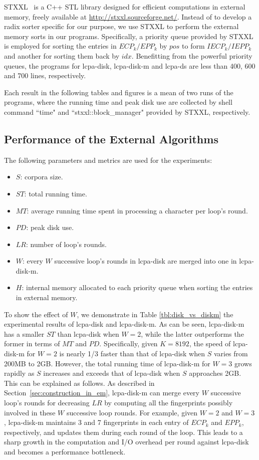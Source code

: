 \documentclass{llncs}
\begin{document}
STXXL~\cite{Dementiev2007} is a {C++} STL library designed for efficient computations in external memory, freely available at \url{http://stxxl.sourceforge.net/}. Instead of to develop a radix sorter specific for our purpose, we use STXXL to perform the external memory sorts in our programs. Specifically, a priority queue  provided by STXXL is employed for sorting the entries in $ECP_k/EPP_k$ by $pos$ to form $IECP_k/IEPP_k$ and another for sorting them back by $idx$. Benefitting from the powerful priority queues, the programs for lcpa-disk, lcpa-disk-m and lcpa-ds are less than 400, 600 and 700 lines, respectively.

Each result in the following tables and figures is a mean of two runs of the programs, where the running time and peak disk use are collected by shell command ``time" and ``stxxl::block\_manager" provided by STXXL, respectively.

\subsection{Performance of the External Algorithms}

The following parameters and metrics are used for the experiments:
\begin{itemize}
\item $S$: corpora size.
\item $ST$: total running time.
\item $MT$: average running time spent in processing a character per loop's round.
\item $PD$: peak disk use.
\item $LR$: number of loop's rounds.
\item $W$: every $W$ successive loop's rounds in lcpa-disk are merged into one in lcpa-disk-m.
\item $H$: internal memory allocated to each priority queue when sorting the entries in external memory.
\end{itemize}

To show the effect of $W$, we demonstrate in Table \ref{tbl:disk_vs_diskm} the experimental results of lcpa-disk and lcpa-disk-m. As can be seen, lcpa-disk-m has a smaller $ST$ than lcpa-disk when $W=2$, while the latter outperforms the former in terms of $MT$ and $PD$. Specifically, given $K=8192$, the speed of lcpa-disk-m for $W=2$ is nearly 1/3 faster than that of lcpa-disk when $S$ varies from 200MB to 2GB. However, the total running time of lcpa-disk-m for $W=3$ grows rapidly as $S$ increases and exceeds that of lcpa-disk when $S$ approaches 2GB. This can be explained as follows. As described in Section~\ref{sec:construction_in_em}, lcpa-disk-m can merge every $W$ successive loop's rounds for decreasing $LR$ by computing all the fingerprints possibly involved in these $W$ successive loop rounds. For example, given $W=2$ and $W=3$, lcpa-disk-m maintains 3 and 7 fingerprints in each entry of $ECP_k$ and $EPP_k$, respectively, and updates them during each round of the loop. This leads to a sharp growth in the computation and I/O overhead per round against lcpa-disk and becomes a performance bottleneck.
\end{document}
